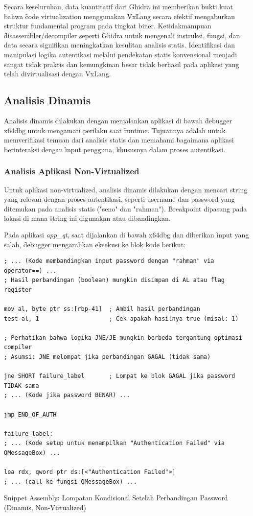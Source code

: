 Secara keseluruhan, data kuantitatif dari Ghidra ini memberikan bukti kuat bahwa \f{code virtualization} menggunakan VxLang secara efektif mengaburkan struktur fundamental program pada tingkat biner. Ketidakmampuan \f{disassembler/decompiler} seperti Ghidra untuk mengenali instruksi, fungsi, dan data secara signifikan meningkatkan kesulitan analisis statis. Identifikasi dan manipulasi logika autentikasi melalui pendekatan statis konvensional menjadi sangat tidak praktis dan kemungkinan besar tidak berhasil pada aplikasi yang telah divirtualisasi dengan VxLang.

\subsection{Analisis Dinamis}
Analisis dinamis dilakukan dengan menjalankan aplikasi di bawah \f{debugger} x64dbg untuk mengamati perilaku saat \f{runtime}. Tujuannya adalah untuk memverifikasi temuan dari analisis statis dan memahami bagaimana aplikasi berinteraksi dengan \f{input} pengguna, khususnya dalam proses autentikasi.

\subsubsection{Analisis Aplikasi Non-Virtualized}

Untuk aplikasi non-virtualized, analisis dinamis dilakukan dengan mencari string yang relevan dengan proses autentikasi, seperti username dan password yang ditemukan pada analisis statis ("seno" dan "rahman"). \f{Breakpoint} dipasang pada lokasi di mana \f{string} ini digunakan atau dibandingkan.

Pada aplikasi \textit{app\_qt}, saat dijalankan di bawah x64dbg dan diberikan \f{input} yang salah, \f{debugger} mengarahkan eksekusi ke blok kode berikut:

\begin{listing}[H]
    \begin{verbatim}
; ... (Kode membandingkan input password dengan "rahman" via operator==) ...
; Hasil perbandingan (boolean) mungkin disimpan di AL atau flag register

mov al, byte ptr ss:[rbp-41]  ; Ambil hasil perbandingan
test al, 1                    ; Cek apakah hasilnya true (misal: 1)

; Perhatikan bahwa logika JNE/JE mungkin berbeda tergantung optimasi compiler
; Asumsi: JNE melompat jika perbandingan GAGAL (tidak sama)

jne SHORT failure_label       ; Lompat ke blok GAGAL jika password TIDAK sama
; ... (Kode jika password BENAR) ...

jmp END_OF_AUTH

failure_label:
; ... (Kode setup untuk menampilkan "Authentication Failed" via QMessageBox) ...

lea rdx, qword ptr ds:[<"Authentication Failed">]
; ... (call ke fungsi QMessageBox) ...

\end{verbatim}
\caption{Snippet Assembly: Lompatan Kondisional Setelah Perbandingan Password (Dinamis, Non-Virtualized)}
\label{lst:asm_dynamic_nonvirt_snippet}
\end{listing}

